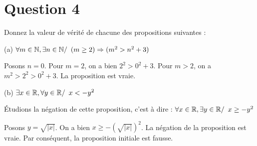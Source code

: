 \section*{Question 4}

\noindent
Donnez la valeur de vérité de chacune des propositions suivantes :

\bigskip
\noindent
(a) \(\forall m \in \mathbb{N}, \exists n \in \mathbb{N} / \enskip (m \geq 2) \Rightarrow (m^2 > n^2 + 3)\)

\medskip
\noindent
Posons $n = 0$. Pour $m = 2$, on a bien $2^2 > 0^2 + 3$. Pour $m > 2$, on a $m^2 > 2^2 > 0^2 + 3$. La proposition est vraie.

\bigskip
\noindent
(b) \(\exists x \in \mathbb{R}, \forall y \in \mathbb{R} / \enskip x < -y^2\)

\medskip
\noindent
Étudions la négation de cette proposition, c’est à dire : \(\forall x \in \mathbb{R}, \exists y \in \mathbb{R} / \enskip x \geq -y^2\)

\medskip
\noindent
Posons $y = \sqrt{|x|}$. On a bien \( x \geq - (\sqrt{|x|})^2\). La négation de la proposition est vraie. Par conséquent, la proposition initiale est fausse. 

